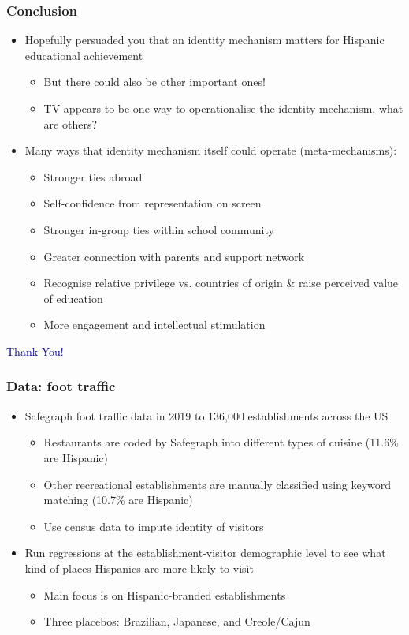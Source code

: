 \documentclass{beamer}
\begin{document}
\begin{frame}
\frametitle{Conclusion}
\begin{itemize}
\item Hopefully persuaded you that an identity mechanism matters for Hispanic educational achievement
\begin{itemize}
\item But there could also be other important ones!
\item TV appears to be one way to operationalise the identity mechanism, what are others?
\end{itemize}
\item Many ways that identity mechanism itself could operate (meta-mechanisms): 
\begin{itemize}
\footnotesize
\item Stronger ties abroad
\item Self-confidence from representation on screen
\item Stronger in-group ties within school community
\item Greater connection with parents and support network
\item Recognise relative privilege vs. countries of origin \& raise perceived value of education
\item More engagement and intellectual stimulation 
\end{itemize}

\end{itemize}
\end{frame}

		
\begin{frame}
\Large \centering \textcolor{darkblue}{Thank You!}
\end{frame}


\begin{frame}
\frametitle{Data: foot traffic}
\begin{itemize}
\item Safegraph foot traffic data in 2019 to 136,000 establishments across the US
\begin{itemize}
\item Restaurants are coded by Safegraph into different types of cuisine (11.6\% are Hispanic)
\item Other recreational establishments are manually classified using keyword matching (10.7\% are Hispanic)
\item Use census data to impute identity of visitors
\end{itemize}
\item Run regressions at the establishment-visitor demographic level to see what kind of places Hispanics are more likely to visit
\begin{itemize}
\item Main focus is on Hispanic-branded establishments
\item Three placebos: Brazilian, Japanese, and Creole/Cajun
\end{itemize}
\end{itemize}
\end{frame}
\end{document}
